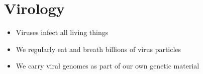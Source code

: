 \documentclass[
]{book}
\begin{document}
\hypertarget{virology}{%
\chapter{Virology}\label{virology}}

\begin{itemize}
\item
  Viruses infect all living things
\item
  We regularly eat and breath billions of virus particles
\item
  We carry viral genomes as part of our own genetic material
\end{itemize}

  
\end{document}
